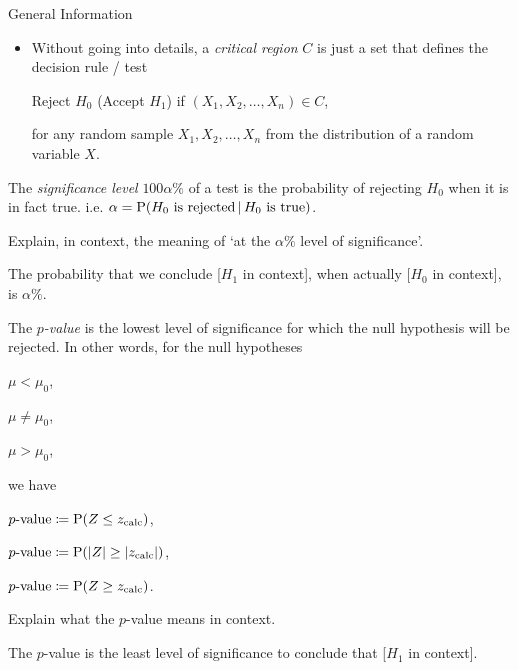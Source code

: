 \begin{stbox}{General Information}
  \begin{itemize}
    \item Without going into details, a \emph{critical region} \(C\) is just a set that defines the decision rule / test 
    \begin{center}
      Reject \(H_0\) (Accept \(H_1\)) \quad if \((X_1,X_2,\dots,X_n)\in C\),
    \end{center}
    for any random sample \(X_1,X_2,\dots,X_n\) from the distribution of a random variable \(X\).
  \end{itemize}
\end{stbox}
\begin{definition}{}{}
  The \emph{significance level} \(100\alpha\%\) of a test is the probability of rejecting \(H_0\) when it is in fact true. i.e. \(\alpha=\operatorname{P}(H_0\text{ is rejected}\,\vert\,H_0\text{ is true})\).
\end{definition}
\begin{note}
  Explain, in context, the meaning of `at the \(\alpha\%\) level of significance'.
  \begin{center}
    \parbox{0.9\textwidth}{
      The probability that we conclude [\(H_1\) in context], when actually [\(H_0\) in context], is \(\alpha\%\).
    }
  \end{center}
\end{note}
\begin{definition}{}{}
  The \emph{\(p\)-value} is the lowest level of significance for which the null hypothesis will be rejected. In other words, for the null hypotheses
    \begin{center}
      \begin{enumerate*}[label=(\alph*),itemjoin={\quad}]
        \item \(\mu<\mu_0\),
        \item \(\mu \neq \mu_0\),
        \item \(\mu>\mu_0\),
      \end{enumerate*}
    \end{center}
    we have
    \begin{center}
      \begin{enumerate*}[label=(\alph*),itemjoin={\quad}]
        \item \(p\text{-value}\coloneq\operatorname{P}(Z\leq z_\text{calc})\),
        \item \(p\text{-value}\coloneq\operatorname{P}(\lvert Z \rvert\geq \lvert z_\text{calc} \rvert)\),
        \item \(p\text{-value}\coloneq\operatorname{P}(Z\geq z_\text{calc})\).
      \end{enumerate*}
    \end{center}
\end{definition}
\begin{note}
  Explain what the \(p\)-value means in context.
  \begin{center}
    \parbox{0.9\textwidth}{
      The \(p\)-value is the least level of significance to conclude that [\(H_1\) in context].
    }
  \end{center}
\end{note}
